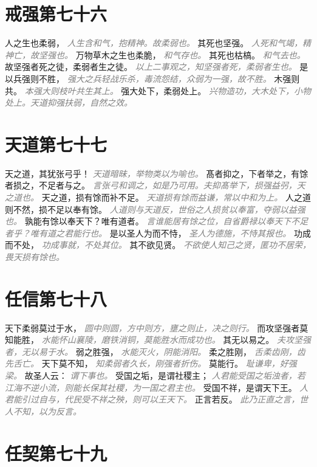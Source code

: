 \documentclass[a4paper,zihao=-4,oneside,landscape,UTF8]{ctexart}
\newcommand{\zhushi}[1]{\scriptsize{\textit{\textcolor{gray}{#1}}}\normalsize}
\begin{document}
\section{戒强第七十六}

人之生也柔弱，
\zhushi{人生含和气，抱精神。故柔弱也。}
其死也坚强。
\zhushi{人死和气竭，精神亡，故坚强也。}
万物草木之生也柔脆，
\zhushi{和气存也。}
其死也枯槁。
\zhushi{和气去也。}
故坚强者死之徒，柔弱者生之徒。
\zhushi{以上二事观之，知坚强者死，柔弱者生也。}
是以兵强则不胜，
\zhushi{强大之兵轻战乐杀，毒流怨结，众弱为一强，故不胜。}
木强则共。
\zhushi{本强大则枝叶共生其上。}
强大处下，柔弱处上。
\zhushi{兴物造功，大木处下，小物处上。天道抑强扶弱，自然之效。}


\section{天道第七十七}

天之道，其犹张弓乎！
\zhushi{天道暗昧，举物类以为喻也。}
髙者抑之，下者举之，有馀者损之，不足者与之。
\zhushi{言张弓和调之，如是乃可用。夫抑髙举下，损强益弜，天之道也。}
天之道，损有馀而补不足。
\zhushi{天道损有馀而益谦，常以中和为上。}
人之道则不然，损不足以奉有馀。
\zhushi{人道则与天道反，世俗之人损贫以奉富，夺弱以益强也。}
孰能有馀以奉天下？唯有道者。
\zhushi{言谁能居有馀之位，自省爵禄以奉天下不足者乎？唯有道之君能行也。}
是以圣人为而不恃，
\zhushi{圣人为德施，不恃其报也。}
功成而不处，
\zhushi{功成事就，不处其位。}
其不欲见贤。
\zhushi{不欲使人知己之贤，匿功不居荣，畏天损有馀也。}


\section{任信第七十八}

天下柔弱莫过于水，
\zhushi{圆中则圆，方中则方，壅之则止，决之则行。}
而攻坚强者莫知能胜，
\zhushi{水能怀山襄陵，磨铁消铜，莫能胜水而成功也。}
其无以易之。
\zhushi{夫攻坚强者，无以易于水。}
弱之胜强，
\zhushi{水能灭火，阴能消阳。}
柔之胜刚，
\zhushi{舌柔齿刚，齿先舌亡。}
天下莫不知，
\zhushi{知柔弱者久长，刚强者折伤。}
莫能行。
\zhushi{耻谦卑，好强梁。}
故圣人云：
\zhushi{谓下事也。}
受国之垢，是谓社稷主；
\zhushi{人君能受国之垢浊者，若江海不逆小流，则能长保其社稷，为一国之君主也。}
受国不祥，是谓天下王。
\zhushi{人君能引过自与，代民受不祥之殃，则可以王天下。}
正言若反。
\zhushi{此乃正直之言，世人不知，以为反言。}


\section{任契第七十九}
\end{document}
